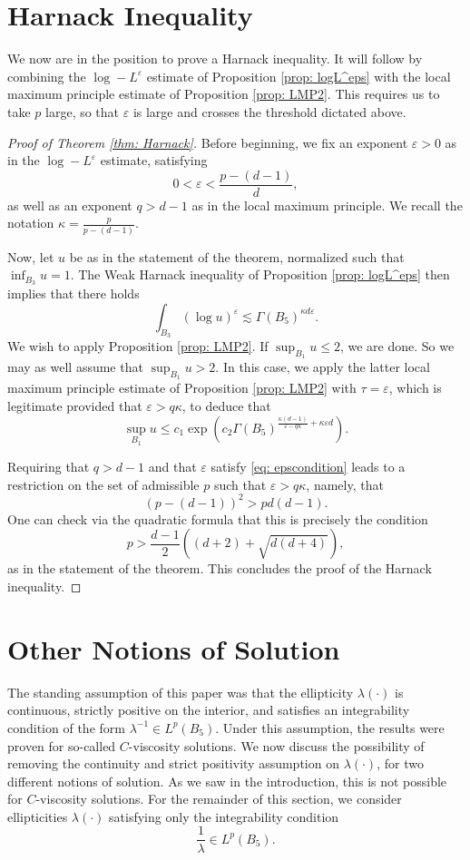 \documentclass[reqno]{amsart}
\numberwithin{equation}{section}
\numberwithin{equation}{section}
\newcommand{\eps}{\varepsilon}
\newcommand{\ds}{\displaystyle}
\newcounter{case}
\begin{document}
\section{Harnack Inequality}
\label{sec: Harnack}
We now are in the position to prove a Harnack inequality. It will follow by combining the $\log-L^\eps$ estimate of Proposition \ref{prop: logL^eps} with the local maximum principle estimate of Proposition \ref{prop: LMP2}. This requires us to take $p$ large, so that $\eps$ is large and crosses the threshold dictated above. 
\begin{proof}[Proof of Theorem \ref{thm: Harnack}]
Before beginning, we fix an exponent $\eps>0$ as in the $\log-L^\eps$ estimate, satisfying 
\begin{equation}
    \label{eq: epscondition}
    0<\eps < \frac{p-(d-1)}{d},
\end{equation}
as well as an exponent $q>d-1$ as in the local maximum principle. We recall the notation $\ds \kappa =\ds \frac{p}{p-(d-1)}.$

Now, let $u$ be as in the statement of the theorem, normalized such that $\ds \inf_{B_3} u= 1$. The Weak Harnack inequality of Proposition \ref{prop: logL^eps} then implies that there holds 
$$\int_{B_3} (\log u)^\eps \lesssim \Gamma(B_5)^{\kappa d \eps}.$$
We wish to apply Proposition \ref{prop: LMP2}. If $\sup_{B_1} u \le 2$, we are done. So we may as well assume that $\sup_{B_1}u >2$. In this case, we apply the latter local maximum principle estimate of Proposition \ref{prop: LMP2} with $\tau = \eps$, which is legitimate provided that $\eps>q\kappa$, to deduce that
$$\sup_{B_1} u \le c_1 \exp\left(c_2 \Gamma(B_5)^{\frac{\kappa(d-1)}{\eps - q\kappa}+ \kappa \eps d}\right).$$

Requiring that $q>d-1$ and that $\eps$ satisfy \eqref{eq: epscondition} leads to a restriction on the set of admissible $p$ such that $\eps > q \kappa$, namely, that
    $$(p-(d-1))^2 > pd(d-1).$$
    One can check via the quadratic formula that this is precisely the condition 
    $$p > \frac{d-1}{2}\left((d+2) + \sqrt{d(d+4)}\right),$$
as in the statement of the theorem. This concludes the proof of the Harnack inequality.
\end{proof}
\section{Other Notions of Solution}
\label{sec: othernotions}
The standing assumption of this paper was that the ellipticity $\lambda(\cdot)$ is continuous, strictly positive on the interior, and satisfies an integrability condition of the form $\lambda^{-1} \in L^p(B_5).$
Under this assumption, the results were proven for so-called $C$-viscosity solutions. We now discuss the possibility of removing the continuity and strict positivity assumption on $\lambda(\cdot)$, for two different notions of solution. As we saw in the introduction, this is not possible for $C$-viscosity solutions. For the remainder of this section, we consider ellipticities $\lambda(\cdot)$ satisfying only the integrability condition
$$\frac1\lambda \in L^p(B_5).$$
\end{document}
